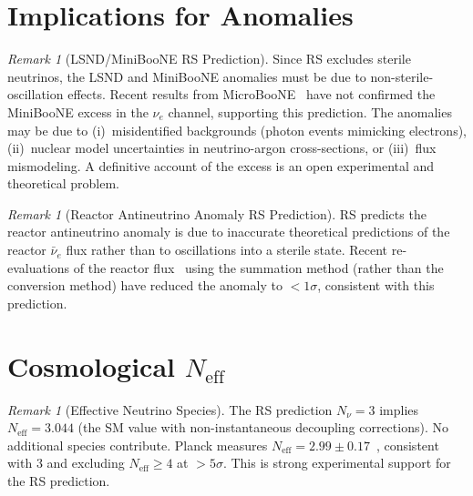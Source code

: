 \documentclass[12pt,a4paper]{article}
\theoremstyle{definition}
\theoremstyle{remark}
\newtheorem{remark}[theorem]{Remark}
\begin{document}
\section{Implications for Anomalies}
\label{sec:anomalies}

\begin{remark}[LSND/MiniBooNE RS Prediction]
Since RS excludes sterile neutrinos, the LSND and MiniBooNE
anomalies must be due to non-sterile-oscillation effects.
Recent results from MicroBooNE~\cite{MicroBooNE2022} have not
confirmed the MiniBooNE excess in the $\nu_e$ channel, supporting
this prediction.  The anomalies may be due to
(i)~misidentified backgrounds (photon events mimicking electrons),
(ii)~nuclear model uncertainties in neutrino-argon cross-sections,
or (iii)~flux mismodeling.  A definitive account of the excess
is an open experimental and theoretical problem.
\end{remark}

\begin{remark}[Reactor Antineutrino Anomaly RS Prediction]
RS predicts the reactor antineutrino anomaly is due to inaccurate
theoretical predictions of the reactor $\bar{\nu}_e$ flux rather
than to oscillations into a sterile state.
Recent re-evaluations of the reactor flux~\cite{Kopeikin2021}
using the summation method (rather than the conversion method) have
reduced the anomaly to $< 1\sigma$, consistent with this prediction.
\end{remark}

\section{Cosmological $N_{\mathrm{eff}}$}
\label{sec:neff}

\begin{remark}[Effective Neutrino Species]
The RS prediction $N_\nu = 3$ implies $N_{\mathrm{eff}} = 3.044$
(the SM value with non-instantaneous decoupling corrections).
No additional species contribute.
Planck measures $N_{\mathrm{eff}} = 2.99 \pm 0.17$~\cite{Planck2020},
consistent with 3 and excluding $N_{\mathrm{eff}} \geq 4$ at
$> 5\sigma$.  This is strong experimental support for the RS prediction.
\end{remark}
\end{document}

